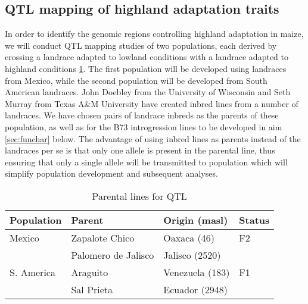 \subsection{QTL mapping of highland adaptation traits}

In order to identify the genomic regions controlling highland adaptation in maize, we will conduct QTL mapping studies of two populations, each derived by crossing a landrace adapted to lowland conditions with a landrace adapted to highland conditions \ref{tab:qtlpops}.  The first population will be developed using landraces from Mexico, while the second population will be developed from South American landraces.  John Doebley from the University of Wisconsin and Seth Murray from Texas A&M University have created inbred lines from a number of landraces.  We have chosen pairs of landrace inbreds as the parents of these population, as well as for the B73 introgression lines to be developed in aim \ref{sec:funchar} below.  The advantage of using inbred lines as parents instead of the landraces per se is that only one allele is present in the parental line, thus ensuring that only a single allele will be transmitted to population which will simplify population development and subsequent analyses.  

\begin{table}
\begin{center}
\caption{Parental lines for QTL} \label{tab:qtlpops}
\begin{tabular}{llll}\\\toprule  
{\bf Population}	& {\bf Parent } &	{\bf Origin (masl)} & {\bf Status }\\ \midrule
 \rowcolor{gray!25}
Mexico	& Zapalote Chico		& Oaxaca	 (46)		&  F2 \\ 
 \rowcolor{gray!25}
	& 	Palomero de Jalisco	& 	Jalisco (2520)		& \\
S. America	& Araguito	& Venezuela (183)	&  F1 \\ 
	& Sal Prieta	 & Ecuador (2948) & \\ \bottomrule
\end{tabular}
\end{center}
\end{table} 

